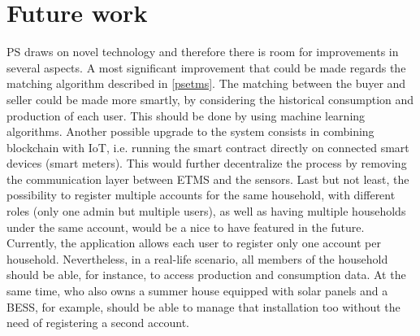 \section{Future work} 


\ac{PS} draws on novel technology and therefore there is room for improvements in several aspects. A most significant improvement that could be made regards the matching algorithm described in \cref{psetms}. The matching between the buyer and seller could be made more smartly, by considering the historical consumption and production of each user. This should be done by using machine learning algorithms. Another possible upgrade to the system consists in combining blockchain with \ac{IoT}, i.e. running the smart contract directly on connected smart devices (smart meters). This would further decentralize the process by removing the communication layer between \ac{ETMS} and the sensors.
Last but not least, the possibility to register multiple accounts for the same household, with different roles (only one admin but multiple users), as well as having multiple households under the same account, would be a nice to have featured in the future. Currently, the application allows each user to register only one account per household. Nevertheless, in a real-life scenario, all members of the household should be able, for instance, to access production and consumption data. At the same time, who also owns a summer house equipped with solar panels and a \ac{BESS}, for example, should be able to manage that installation too without the need of registering a second account. 



